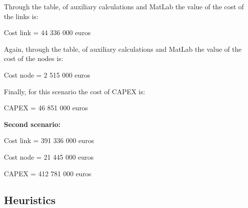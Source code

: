 Through the table, of auxiliary calculations and MatLab the value of the cost of the links is:

Cost link = 44 336 000 euros

Again, through the table, of auxiliary calculations and MatLab the value of the cost of the nodes is:

Cost node = 2 515 000 euros

Finally, for this scenario the cost of CAPEX is:

CAPEX = 46 851 000 euros

\textbf{Second scenario:}

Cost link = 391 336 000 euros

Cost node = 21 445 000 euros

CAPEX = 412 781 000 euros

\subsection{Heuristics}

